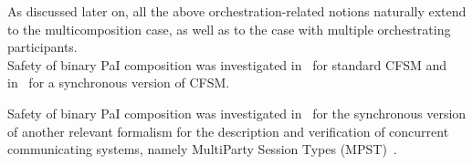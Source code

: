 \noindent
As discussed later on, all the above orchestration-related notions naturally extend to the multicomposition case, as well as to the case with multiple orchestrating participants.\\


Safety of binary PaI composition was investigated in~\cite{BdLH19}  for standard CFSM 
and in~\cite{BLT20,BLP22b,BLT23} for a synchronous version of CFSM.  
 
Safety of binary PaI composition was investigated in~\cite{BDLT21} for the synchronous 
version of another relevant formalism for the description and verification of concurrent communicating systems, namely
MultiParty Session Types  (MPST)~\cite{HYC08,Honda2016}. 

 









 
 
 
 



 
 
 
 
 


